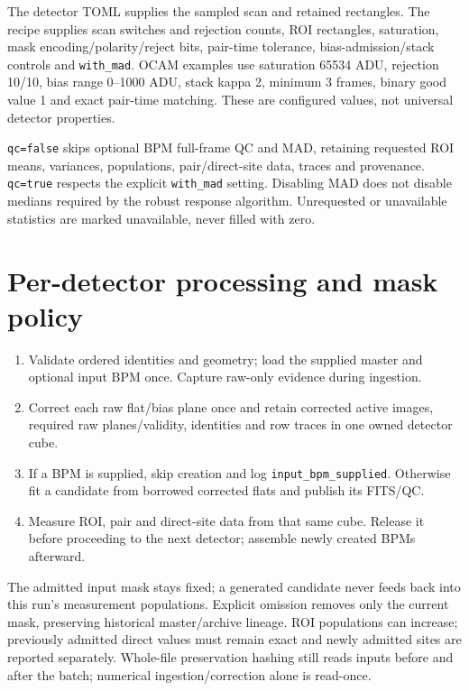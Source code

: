 \documentclass[10pt,a4paper]{article}
\begin{document}
The detector TOML supplies the sampled scan and retained rectangles.
The recipe supplies scan switches and rejection counts, ROI rectangles,
saturation, mask encoding/polarity/reject bits, pair-time tolerance,
bias-admission/stack controls and \texttt{with\_mad}.
OCAM examples use saturation 65534 ADU, rejection 10/10, bias range 0--1000 ADU,
stack kappa 2, minimum 3 frames, binary good value 1 and exact pair-time matching.
These are configured values, not universal detector properties.

\texttt{qc=false} skips optional BPM full-frame QC and MAD, retaining requested
ROI means, variances, populations, pair/direct-site data, traces and provenance.
\texttt{qc=true} respects the explicit \texttt{with\_mad} setting. Disabling MAD
does not disable medians required by the robust response algorithm. Unrequested
or unavailable statistics are marked unavailable, never filled with zero.

\section*{Per-detector processing and mask policy}
\begin{enumerate}
\item Validate ordered identities and geometry; load the supplied master and
optional input BPM once. Capture raw-only evidence during ingestion.
\item Correct each raw flat/bias plane once and retain corrected active images,
required raw planes/validity, identities and row traces in one owned detector cube.
\item If a BPM is supplied, skip creation and log \texttt{input\_bpm\_supplied}.
Otherwise fit a candidate from borrowed corrected flats and publish its FITS/QC.
\item Measure ROI, pair and direct-site data from that same cube. Release it
before proceeding to the next detector; assemble newly created BPMs afterward.
\end{enumerate}
The admitted input mask stays fixed; a generated candidate never feeds back into
this run's measurement populations. Explicit omission removes only the current
mask, preserving historical master/archive lineage. ROI populations can increase;
previously admitted direct values must remain exact and newly admitted sites are
reported separately. Whole-file preservation hashing still reads inputs before
and after the batch; numerical ingestion/correction alone is read-once.

\newpage
\end{document}
